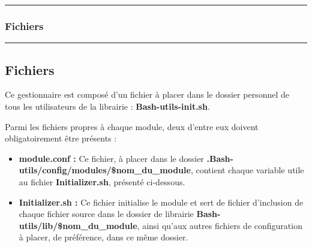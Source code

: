 \documentclass[a4paper,10pt]{article}
\begin{document}
\begin{justify}

\end{justify}


\color{blue}\par\noindent\rule{\textwidth}{0.4pt}\color{white}

\color{blue}
\subsubsection{Fichiers}\color{white}

\begin{justify}

\end{justify}




\color{green}\par\noindent\rule{\textwidth}{0.4pt}\color{white}

\color{green}
\subsection{Fichiers}\color{white}

\begin{justify}
    Ce gestionnaire est composé d'un fichier à placer dans le dossier personnel de tous les utilisateurs de la librairie :  \textbf{\color{lime}Bash-utils-init.sh}.
\end{justify}

\begin{justify}
    Parmi les fichiers propres à chaque module, deux d'entre eux doivent obligatoirement être présents :

    \begin{itemize}
        \item \textbf{\color{lime}module.conf\color{white} :} Ce fichier, à placer dans le dossier \textbf{\color{lime}.Bash-utils/config/modules/\$nom\_du\_module}, contient chaque variable utile au fichier \textbf{\color{lime}Initializer.sh}, présenté ci-dessous.\\

        \item \textbf{\color{lime}Initializer.sh\color{white} :} Ce fichier initialise le module et sert de fichier d'inclusion de chaque fichier source dans le dossier de librairie \textbf{\color{lime}Bash-utils/lib/\$nom\_du\_module}, ainsi qu'aux autres fichiers de configuration à placer, de préférence, dans ce même dossier.
    \end{itemize}
\end{justify}
\end{document}
